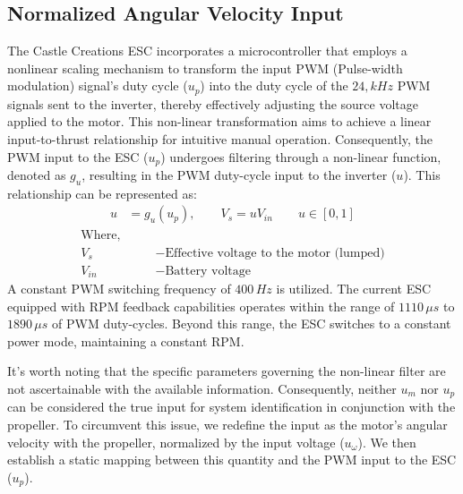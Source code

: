 \subsection{Normalized Angular Velocity Input}
The Castle Creations ESC incorporates a microcontroller that employs a
nonlinear scaling mechanism to transform the input PWM (Pulse-width modulation) signal's duty cycle
($u_p$) into the duty cycle of the $24,kHz$ PWM signals sent to the inverter,
thereby effectively adjusting the source voltage applied to the
motor\cite{kim2017electric}. This non-linear transformation aims to achieve a
linear input-to-thrust relationship for intuitive manual operation.
Consequently, the PWM input to the ESC ($u_p$) undergoes filtering through a
non-linear function, denoted as $g_u$, resulting in the PWM duty-cycle input to
the inverter ($u$). This relationship can be represented as:
\begin{align}\label{eqn::esc_input}
    u &= g_u(u_p), \qquad
    V_s = u V_{in} \qquad u \in [0, 1]
\end{align}
\begin{align*}
\text{Where,}\qquad&\\
    V_s &- \text{Effective voltage to the motor (lumped)}\\
    V_{in} &- \text{Battery voltage}
\end{align*}
A constant PWM switching frequency of $400 \, Hz$ is utilized. The current ESC
equipped with RPM feedback capabilities operates within the range of $1110 \,
\mu s$ to $1890 \, \mu s$ of PWM duty-cycles. Beyond this range, the ESC
switches to a constant power mode, maintaining a constant RPM.

It's worth noting that the specific parameters governing the non-linear filter are not ascertainable with the available information. Consequently, neither $u_m$ nor $u_p$ can be considered the true input for system identification in conjunction with the propeller. To circumvent this issue, we redefine the input as the motor's angular velocity with the propeller, normalized by the input voltage ($u_\omega$). We then establish a static mapping between this quantity and the PWM input to the ESC ($u_p$).

